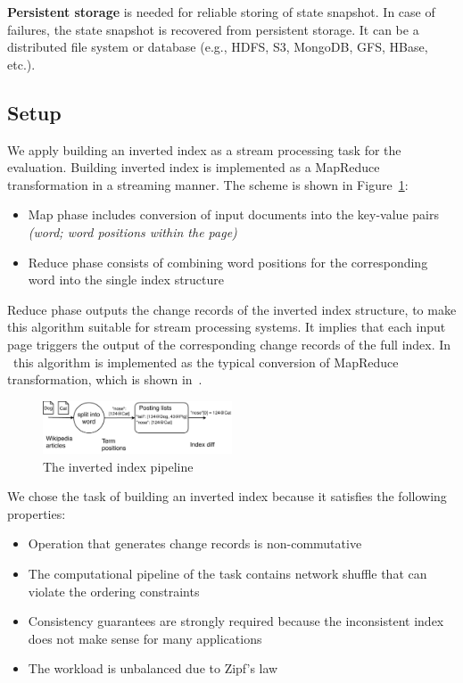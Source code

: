 {\bf Persistent storage} is needed for reliable storing of state snapshot. In case of failures, the state snapshot is recovered from persistent storage. It can be a distributed file system or database (e.g., HDFS, S3, MongoDB, GFS, HBase, etc.).

\subsection{Setup}
We apply building an inverted index as a stream processing task for the evaluation. Building inverted index is implemented as a MapReduce transformation in a streaming manner. The scheme is shown in Figure~\ref{index}: 

\begin{itemize}
    \item Map phase includes conversion of input documents into the key-value pairs {\it (word; word positions within the page)}
    \item Reduce phase consists of combining word positions for the corresponding word into the single index structure 
\end{itemize}

Reduce phase outputs the change records of the inverted index structure, to make this algorithm suitable for stream processing systems. It implies that each input page triggers the output of the corresponding change records of the full index. In \FlameStream\ this algorithm is implemented as the typical conversion of MapReduce transformation, which is shown in~\cite{we2018seim}.

\begin{figure}[htbp]
  \centering
  \includegraphics[width=0.50\textwidth]{pics/index}
  \caption{The inverted index pipeline}
  \label {index}
\end{figure}

We chose the task of building an inverted index because it satisfies the following properties:

\begin{itemize}
    \item Operation that generates change records is non-commutative
    \item The computational pipeline of the task contains network shuffle that can violate the ordering constraints
    \item Consistency guarantees are strongly required because the inconsistent index does not make sense for many applications
    \item The workload is unbalanced due to Zipf's law
\end{itemize}

